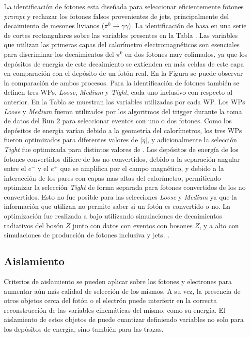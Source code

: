 La identificación de fotones esta diseñada para seleccionar eficientemente fotones \textit{prompt} y rechazar los fotones falsos provenientes de jets, principalmente del decaimiento de mesones livianos ($\pi^{0}\to\gamma\gamma$). La identificación de basa en una serie de cortes rectangulares sobre las variables presentes en la Tabla . Las variables que utilizan las primeras capas del calorímetro electromagnéticos son esenciales para discriminar los decaimientos del $\pi^{0}$ en dos fotones muy colimados, ya que los depósitos de energía de este decaimiento se extienden en más celdas de este capa en comparación con el depósito de un fotón real. En la Figura  se puede observar la comparación de ambos procesos. 
Para la identificación de fotones también se definen tres WPs, \textit{Loose}, \textit{Medium} y \textit{Tight}, cada uno inclusivo con respecto al anterior. En la Tabla  se muestran las variables utilizadas por cada WP. Los WPs \textit{Loose} y \textit{Medium}  fueron utilizados por los algoritmos del trigger durante la toma de datos del Run 2 para seleccionar eventos con uno o dos fotones. Como los depósitos de energía varían debido a la geometría del calorímetros, los tres WPs fueron optimizados para diferentes valores de $|\eta|$, y adicionalmente la selección \textit{Tight} fue optimizada para distintos valores de \ET. Los depósitos de energía de los fotones convertidos difiere de los no convertidos, debido a la separación angular entre el $e^-$ y el $e^+$ que se amplifica por el campo magnético, y debido a la interacción de los pares con capas mas altas del calorímetro, permitiendo optimizar la selección \textit{Tight} de forma separada para fotones convertidos de los no convertidos. Esto no fue posible para las selecciones \textit{Loose} y \textit{Medium} ya que la información que utilizan no permite saber si un fotón es convertido o no. La optimización fue realizada a bajo \ET utilizando simulaciones de decaimientos radiativos del bosón $Z$ junto con datos con eventos con bosones $Z$, y a alto \ET con simulaciones de producción de fotones inclusiva y jets. .



\subsection{Aislamiento}


Criterios de aislamiento se pueden aplicar sobre los fotones y electrones para aumentar aún más calidad de selección de los mismos. A su vez, la presencia de otros objetos cerca del fotón o el electrón puede interferir en la correcta reconstrucción de las variables cinemáticas del mismo, como su energía. El aislamiento de estos objetos de puede cuantizar definiendo variables no solo para los depósitos de energía, sino también para las trazas.

